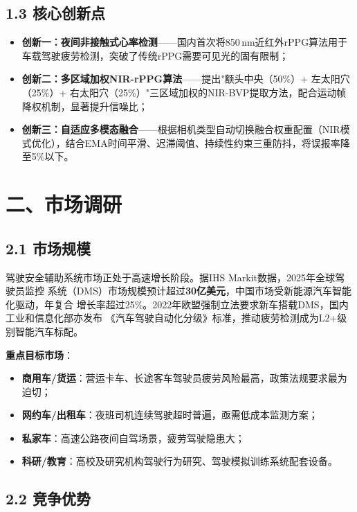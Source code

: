 \documentclass[a4paper,12pt]{article}
\begin{document}
\subsection*{1.3 核心创新点}

\begin{itemize}[leftmargin=2em, itemsep=4pt]
  \item \textbf{创新一：夜间非接触式心率检测}——国内首次将850\,nm近红外rPPG算法用于车载驾驶疲劳检测，突破了传统rPPG需要可见光的固有限制；
  \item \textbf{创新二：多区域加权NIR-rPPG算法}——提出"额头中央（50\%）+ 左太阳穴（25\%）+ 右太阳穴（25\%）"三区域加权的NIR-BVP提取方法，配合运动帧降权机制，显著提升信噪比；
  \item \textbf{创新三：自适应多模态融合}——根据相机类型自动切换融合权重配置（NIR模式优化），结合EMA时间平滑、迟滞阈值、持续性约束三重防抖，将误报率降至5\%以下。
\end{itemize}

\section*{二、市场调研}

\subsection*{2.1 市场规模}

驾驶安全辅助系统市场正处于高速增长阶段。据IHS Markit数据，2025年全球驾驶员监控
系统（DMS）市场规模预计超过\textbf{30亿美元}，中国市场受新能源汽车智能化驱动，年复合
增长率超过25\%。2022年欧盟强制立法要求新车搭载DMS，国内工业和信息化部亦发布
《汽车驾驶自动化分级》标准，推动疲劳检测成为L2+级别智能汽车标配。

\textbf{重点目标市场}：
\begin{itemize}[leftmargin=2em, itemsep=2pt]
  \item \textbf{商用车/货运}：营运卡车、长途客车驾驶员疲劳风险最高，政策法规要求最为迫切；
  \item \textbf{网约车/出租车}：夜班司机连续驾驶超时普遍，亟需低成本监测方案；
  \item \textbf{私家车}：高速公路夜间自驾场景，疲劳驾驶隐患大；
  \item \textbf{科研/教育}：高校及研究机构驾驶行为研究、驾驶模拟训练系统配套设备。
\end{itemize}

\subsection*{2.2 竞争优势}
\end{document}
